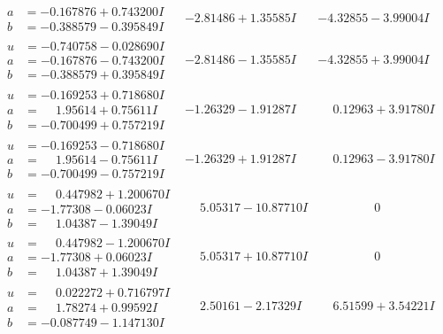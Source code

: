 \documentclass[1p]{elsarticle_modified}
\theoremstyle{definition}
\begin{document}
$$\begin{array}{c|c|c}
\begin{aligned}
a &= -0.167876 + 0.743200 I \\
b &= -0.388579 - 0.395849 I\end{aligned}
 & -2.81486 + 1.35585 I & -4.32855 - 3.99004 I \\ \hline\begin{aligned}
u &= -0.740758 - 0.028690 I \\
a &= -0.167876 - 0.743200 I \\
b &= -0.388579 + 0.395849 I\end{aligned}
 & -2.81486 - 1.35585 I & -4.32855 + 3.99004 I \\ \hline\begin{aligned}
u &= -0.169253 + 0.718680 I \\
a &= \phantom{-}1.95614 + 0.75611 I \\
b &= -0.700499 + 0.757219 I\end{aligned}
 & -1.26329 - 1.91287 I & \phantom{-}0.12963 + 3.91780 I \\ \hline\begin{aligned}
u &= -0.169253 - 0.718680 I \\
a &= \phantom{-}1.95614 - 0.75611 I \\
b &= -0.700499 - 0.757219 I\end{aligned}
 & -1.26329 + 1.91287 I & \phantom{-}0.12963 - 3.91780 I \\ \hline\begin{aligned}
u &= \phantom{-}0.447982 + 1.200670 I \\
a &= -1.77308 - 0.06023 I \\
b &= \phantom{-}1.04387 - 1.39049 I\end{aligned}
 & \phantom{-}5.05317 - 10.87710 I & \phantom{-0.000000 } 0 \\ \hline\begin{aligned}
u &= \phantom{-}0.447982 - 1.200670 I \\
a &= -1.77308 + 0.06023 I \\
b &= \phantom{-}1.04387 + 1.39049 I\end{aligned}
 & \phantom{-}5.05317 + 10.87710 I & \phantom{-0.000000 } 0 \\ \hline\begin{aligned}
u &= \phantom{-}0.022272 + 0.716797 I \\
a &= \phantom{-}1.78274 + 0.99592 I \\
b &= -0.087749 - 1.147130 I\end{aligned}
 & \phantom{-}2.50161 - 2.17329 I & \phantom{-}6.51599 + 3.54221 I\\

\end{array}$$
\end{document}
